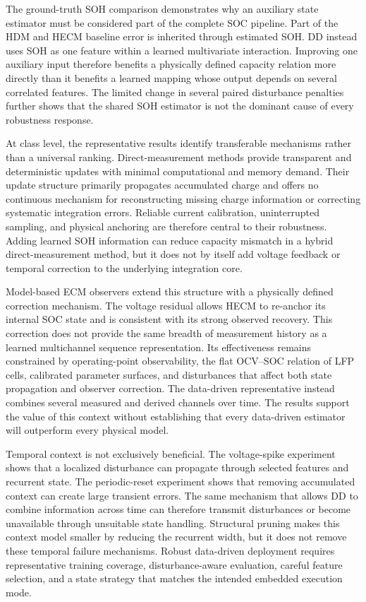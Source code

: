 The ground-truth SOH comparison demonstrates why an auxiliary state estimator must be considered part of the complete SOC pipeline. Part of the HDM and HECM baseline error is inherited through estimated SOH. DD instead uses SOH as one feature within a learned multivariate interaction. Improving one auxiliary input therefore benefits a physically defined capacity relation more directly than it benefits a learned mapping whose output depends on several correlated features. The limited change in several paired disturbance penalties further shows that the shared SOH estimator is not the dominant cause of every robustness response.

At class level, the representative results identify transferable mechanisms rather than a universal ranking. Direct-measurement methods provide transparent and deterministic updates with minimal computational and memory demand. Their update structure primarily propagates accumulated charge and offers no continuous mechanism for reconstructing missing charge information or correcting systematic integration errors. Reliable current calibration, uninterrupted sampling, and physical anchoring are therefore central to their robustness. Adding learned SOH information can reduce capacity mismatch in a hybrid direct-measurement method, but it does not by itself add voltage feedback or temporal correction to the underlying integration core.

Model-based ECM observers extend this structure with a physically defined correction mechanism. The voltage residual allows HECM to re-anchor its internal SOC state and is consistent with its strong observed recovery. This correction does not provide the same breadth of measurement history as a learned multichannel sequence representation. Its effectiveness remains constrained by operating-point observability, the flat OCV--SOC relation of LFP cells, calibrated parameter surfaces, and disturbances that affect both state propagation and observer correction. The data-driven representative instead combines several measured and derived channels over time. The results support the value of this context without establishing that every data-driven estimator will outperform every physical model.

Temporal context is not exclusively beneficial. The voltage-spike experiment shows that a localized disturbance can propagate through selected features and recurrent state. The periodic-reset experiment shows that removing accumulated context can create large transient errors. The same mechanism that allows DD to combine information across time can therefore transmit disturbances or become unavailable through unsuitable state handling. Structural pruning makes this context model smaller by reducing the recurrent width, but it does not remove these temporal failure mechanisms. Robust data-driven deployment requires representative training coverage, disturbance-aware evaluation, careful feature selection, and a state strategy that matches the intended embedded execution mode.


